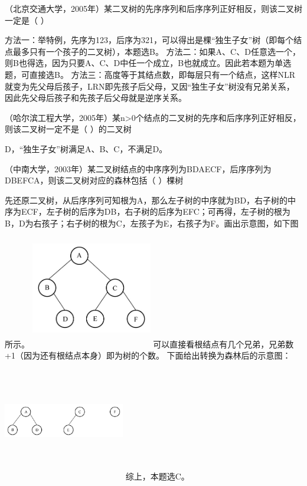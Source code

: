 \question （北京交通大学，2005年）某二叉树的先序序列和后序序列正好相反，则该二叉树一定是（
）
\par{}
\begin{solution}方法一：举特例，先序为123，后序为321，可以得出是棵``独生子女''树（即每个结点最多只有一个孩子的二叉树），本题选B。
方法二：如果A、C、D任意选一个，则B也得选，因为只要A、C、D中任一个成立，B也就成立。因此若本题为单选题，可直接选B。
方法三：高度等于其结点数，即每层只有一个结点，这样NLR就变为先父母后孩子，LRN即先孩子后父母，又因``独生子女''树没有兄弟关系，因此先父母后孩子和先孩子后父母就是逆序关系。
\end{solution}
\question （哈尔滨工程大学，2005年）某n\textgreater{}0个结点的二叉树的先序和后序序列正好相反，则该二叉树一定不是（
）的二叉树
\par{}
\begin{solution}D，``独生子女''树满足A、B、C，不满足D。
\end{solution}
\question （中南大学，2003年）某二叉树结点的中序序列为BDAECF，后序序列为DBEFCA，则该二叉树对应的森林包括（
）棵树
\par{}
\begin{solution}先还原二叉树，从后序序列可知根为A，那么左子树的中序就为BD，右子树的中序为ECF，左子树的后序为DB，右子树的后序为EFC；可再得，左子树的根为B，D为右孩子；右子树的根为C，左孩子为E，右孩子为F。画出示意图，如下图所示。
\includegraphics[width=2.08333in,height=2.08333in]{computerassets/bd459a854ebd7c5ece063bf107b6f012.jpeg}
可以直接看根结点有几个兄弟，兄弟数+1（因为还有根结点本身）即为树的个数。
下面给出转换为森林后的示意图：
\includegraphics[width=2.08333in,height=2.08333in]{computerassets/02d7f3ef22c9ad637a111d6ad3d5cc3d.jpeg}
综上，本题选C。
\end{solution}
